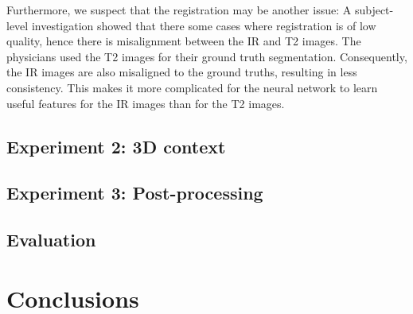 Furthermore, we suspect that the registration may be another issue: A subject-level investigation showed that there some cases where registration is of low quality, hence there is misalignment between the IR and T2 images. The physicians used the T2 images for their ground truth segmentation. Consequently, the IR images are also misaligned to the ground truths, resulting in less consistency. This makes it more complicated for the neural network to learn useful features for the IR images than for the T2 images.

\subsection{Experiment 2: 3D context}
\subsection{Experiment 3: Post-processing}
\subsection{Evaluation}
\section{Conclusions} \label{disc:conclusions}

\endinput